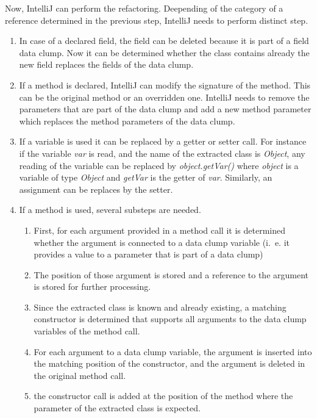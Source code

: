 Now, IntelliJ can perform the refactoring. Deepending of the category of a reference determined in the previous step, IntelliJ needs to perform distinct step. 
\begin{enumerate}
    \item In case of a declared field, the field can be deleted because it is part of a field data clump. Now it can be determined whether the class contains already the new field replaces the fields of the data clump.
    \item If a method is declared, IntelliJ can modify the signature of the method. This can be the original method or an overridden one. IntelliJ needs to remove the parameters that are part of the data clump and add a new method parameter which replaces the method parameters of the data clump. 
    \item If a variable is used it can be replaced by a getter or setter call. For instance if the variable \textit{var} is read, and the name of the extracted class is \textit{Object}, any reading of the variable can be replaced by  \textit{object.getVar()} where \textit{object} is a variable of type \textit{Object} and \textit{getVar} is the getter of \textit{var}. Similarly, an assignment can be replaces by the setter.
    \item If a method is used, several substeps are needed.
    \begin{enumerate}
        \item First, for each argument provided in a method call it is determined whether the argument is connected to a data clump variable (i.~e. it provides a value to a parameter that is part of a data clump) 
        \item The position of those argument is stored and a reference to the argument is stored for further processing.
        \item Since the extracted class is known and already existing, a matching constructor  is determined that supports all arguments to the data clump variables of the method call. 
        \item For each argument to a data clump variable, the argument is inserted into the matching position of the constructor, and the argument  is deleted in the original method call. 
        \item the constructor call is added at the position of the method  where the parameter of the extracted class is expected. 
        
    \end{enumerate}
    
\end{enumerate}

